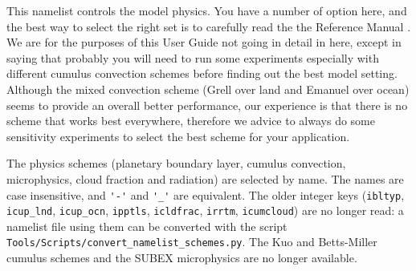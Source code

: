 This namelist controls the model physics. You have a number of option here,
and the best way to select the right set is to carefully read the the
Reference Manual \cite{refman_11}. We are for the purposes of this User Guide
not going in detail in here, except in saying that probably you will need
to run some experiments especially with different cumulus convection
schemes before finding out the best model setting.
Although the mixed convection scheme (Grell over land and Emanuel over ocean)
seems to provide an overall better performance, our experience is that there
is no scheme that works best everywhere, therefore we advice to always do some
sensitivity experiments to select the best scheme for your application.

The physics schemes (planetary boundary layer, cumulus convection,
microphysics, cloud fraction and radiation) are selected by name. The names
are case insensitive, and \verb='-'= and \verb='_'= are equivalent. The
older integer keys (\verb=ibltyp=, \verb=icup_lnd=, \verb=icup_ocn=,
\verb=ipptls=, \verb=icldfrac=, \verb=irrtm=, \verb=icumcloud=) are no
longer read: a namelist file using them can be converted with the script
\verb=Tools/Scripts/convert_namelist_schemes.py=. The Kuo and Betts-Miller
cumulus schemes and the SUBEX microphysics are no longer available.

